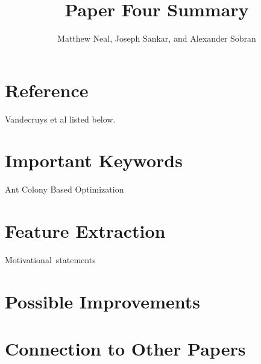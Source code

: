 \documentclass[english]{article}
\begin{document}
\title{Paper Four Summary}


\author{Matthew Neal, Joseph Sankar, and Alexander Sobran}

\maketitle

\section*{Reference}

Vandecruys et al \cite{Vandecruys08} listed below.


\section*{Important Keywords}
\begin{description}
\item [{Ant Colony Based Optimization}] 
\end{description}

\section*{Feature Extraction}
\begin{description}
\item [{Motivational~statements}]
\end{description}



\section*{Possible Improvements}


\section*{Connection to Other Papers}





\end{document}
